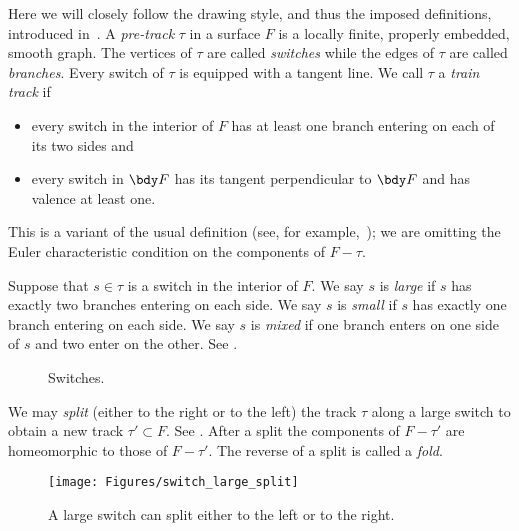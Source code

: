 \documentclass[12pt]{amsart}
\begin{document}
Here we will closely follow the drawing style, and thus the imposed definitions, introduced in~\cite[Figure~11]{Agol11}.  A \emph{pre-track} $\tau$ in a surface $F$ is a locally finite, properly embedded, smooth graph.  The vertices of $\tau$ are called \emph{switches} while the edges of $\tau$ are called \emph{branches}.  Every switch of $\tau$ is equipped with a tangent line.  
We call $\tau$ a \emph{train track} if 
\begin{itemize}
\item 
every switch in the interior of $F$ has at least one branch entering on each of its two sides and
\item 
every switch in $\bdy F$ has its tangent perpendicular to $\bdy F$ and has valence at least one. 
\end{itemize}
This is a variant of the usual definition (see, for example,~\cite[Definition~8.9.1]{thurston_notes}); we are omitting the Euler characteristic condition on the components of $F - \tau$. 


Suppose that $s \in \tau$ is a switch in the interior of $F$.  We say $s$ is \emph{large} if $s$ has exactly two branches entering on each side.  We say $s$ is \emph{small} if $s$ has exactly one branch entering on each side.  We say $s$ is \emph{mixed} if one branch enters on one side of $s$ and two enter on the other.  See .

\begin{figure}[htbp]
\quad
{}
\quad
{}
\caption{Switches.}
\label{Fig:Tracks}
\end{figure}

We may \emph{split} (either to the right or to the left) the track $\tau$ along a large switch to obtain a new track $\tau' \subset F$.  See .  After a split the components of $F - \tau'$ are homeomorphic to those of $F - \tau'$.  The reverse of a split is called a \emph{fold}.

\begin{figure}[htbp]
\texttt{[image: Figures/switch\_large\_split]}
\caption{A large switch can split either to the left or to the right.}
\label{Fig:SwitchSplit}
\end{figure}
\end{document}
